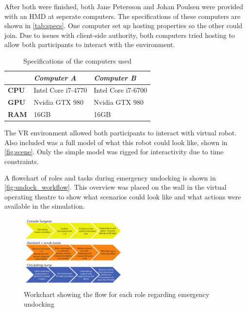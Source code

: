 \documentclass[conference]{IEEEtran}
\begin{document}
After both were finished, both Jane Petersson and Johan Poulsen were provided with an HMD at seperate computers. The specifications of these computers are shown in \autoref{tab:specs}. One computer set up hosting properties so the other could join. Due to issues with client-side authority, both computers tried hosting to allow both participants to interact with the environment.

\begin{table}
\centering
\begin{tabularx}{0.48\textwidth}{X X X}
\toprule
                     & \textit{Computer A} & \textit{Computer B} \\ \midrule \rowcolor{lightGrey}
\textbf{CPU}         & Intel Core i7-4770  & Intel Core i7-6700  \\

\textbf{GPU}         & Nvidia GTX 980      & Nvidia GTX 980    \\  \rowcolor{lightGrey}

\textbf{RAM} 		 & 16GB                & 16GB                 \\ \toprule
\end{tabularx}
\caption{Specifications of the computers used}
\label{tab:specs}
\end{table}

The VR environment allowed both participants to interact with virtual robot. Also included was a full model of what this robot could look like, shown in \autoref{fig:scene}. Only the simple model was rigged for interactivity due to time constraints.


A flowchart of roles and tasks during emergency undocking is shown in \autoref{fig:undock_workflow}. This overview was placed on the wall in the virtual operating theatre to show what scenarios could look like and what actions were available in the simulation. 

\begin{figure}[h]
	\centering
	\includegraphics[width=0.48\textwidth]{figures/workflow_chart}
	\caption{Workchart showing the flow for each role regarding emergency undocking}
	\label{fig:undock_workflow}
\end{figure}
\end{document}
